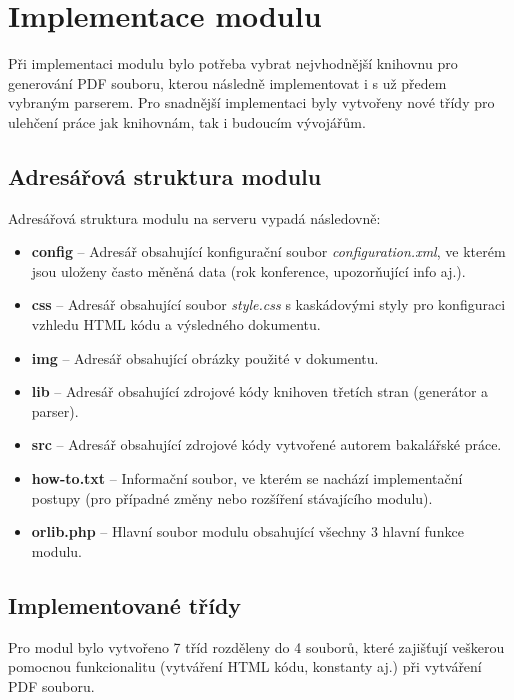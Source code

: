 \DeclarePairedDelimiter\ceil{\lceil}{\rceil}
\DeclarePairedDelimiter\floor{\lfloor}{\rfloor}

\chapter{Implementace modulu}
Při implementaci modulu bylo potřeba vybrat nejvhodnější knihovnu pro generování PDF souboru, kterou následně implementovat i s už předem vybraným parserem. Pro snadnější implementaci byly vytvořeny nové třídy pro ulehčení práce jak knihovnám, tak i budoucím vývojářům.
\section{Adresářová struktura modulu}
Adresářová struktura modulu na serveru vypadá následovně:
\begin{itemize}
	\item \textbf{config} -- Adresář obsahující konfigurační soubor \textit{configuration.xml}, ve kterém jsou uloženy často měněná data (rok konference, upozorňující info aj.).  
	\item \textbf{css} --  Adresář obsahující soubor \textit{style.css} s kaskádovými styly pro konfiguraci vzhledu HTML kódu a výsledného dokumentu. 
	\item \textbf{img} -- Adresář obsahující obrázky použité v dokumentu.
	\item \textbf{lib} -- Adresář obsahující zdrojové kódy knihoven třetích stran (generátor a parser).
	\item \textbf{src} -- Adresář obsahující zdrojové kódy vytvořené autorem bakalářské práce.
	\item \textbf{how-to.txt} -- Informační soubor, ve kterém se nachází implementační postupy (pro případné změny nebo rozšíření stávajícího modulu).
	\item \textbf{orlib.php} -- Hlavní soubor modulu obsahující všechny 3 hlavní funkce modulu.
\end{itemize}
\section{Implementované třídy}
Pro modul bylo vytvořeno 7 tříd rozděleny do 4 souborů, které zajišťují veškerou pomocnou funkcionalitu (vytváření HTML kódu, konstanty aj.) při vytváření PDF souboru. 
